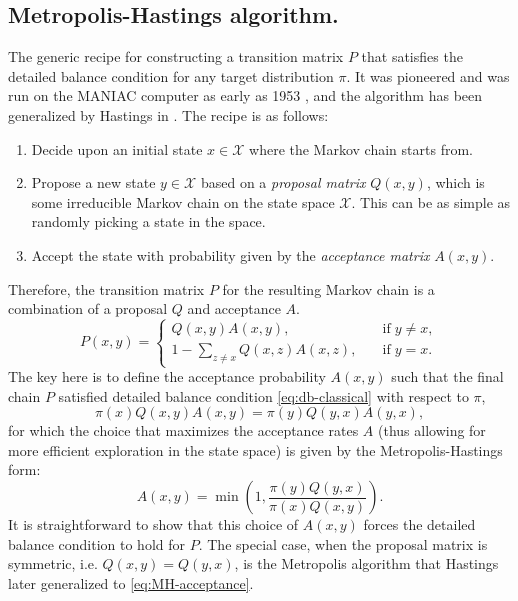 \label{parag:MH}
\smallskip
\subsection{Metropolis-Hastings algorithm.} The generic recipe for constructing a transition matrix $P$ that satisfies the detailed balance condition for any target distribution $\pi$. It was pioneered and was run on the MANIAC computer as early as 1953 \cite{metropolis1953equation}, and the algorithm has been generalized by Hastings in \cite{hastings1970monte}. The recipe is as follows:
\begin{enumerate}
    \item Decide upon an initial state $x\in\mathcal{X}$ where the Markov chain starts from. 
    \item Propose a new state $y\in\mathcal{X}$ based on a \textit{proposal matrix} $Q(x, y)$, which is some irreducible Markov chain on the state space $\mathcal{X}$. This can be as simple as randomly picking a state in the space. 
    \item Accept the state with probability given by the \textit{acceptance matrix} $A(x,y)$.
\end{enumerate}
Therefore, the transition matrix $P$ for the resulting Markov chain is a combination of a proposal $Q$ and acceptance $A$.
\begin{equation}
    P(x,y) =
\begin{cases}
    Q(x,y)A(x,y), \quad &\text{if}\; y\neq x, \\
    1 - \sum_{z\neq x} Q(x, z)A(x, z), \quad &\text{if}\;y = x.
\end{cases} 
\end{equation}
The key here is to define the acceptance probability $A(x, y)$ such that the final chain $P$ satisfied detailed balance condition \eqref{eq:db-classical} with respect to $\pi$, 
\begin{equation}
    \pi(x) Q(x, y) A(x, y) = \pi(y) Q(y, x) A(y, x),
\end{equation}
for which the choice that maximizes the acceptance rates $A$ (thus allowing for more efficient exploration in the state space) is given by the Metropolis-Hastings form: 
\begin{equation}
    \label{eq:MH-acceptance}
    A(x,y) = \min\left(1, \frac{\pi(y)Q(y, x)}{\pi(x)Q(x,y)}\right).
\end{equation}
It is straightforward to show that this choice of $A(x,y)$ forces the detailed balance condition to hold for $P$. The special case, when the proposal matrix is symmetric, i.e. $Q(x, y) = Q(y, x)$, is the Metropolis algorithm that Hastings later generalized to \eqref{eq:MH-acceptance}.

